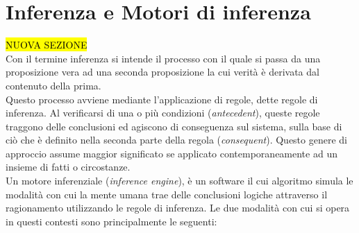 \section{Inferenza e Motori di inferenza}
\hl{NUOVA SEZIONE} \\
 \label{App:AppendiceInference}
 Con  il termine inferenza si intende il processo con il quale si passa da una proposizione vera ad una seconda proposizione la cui verità è derivata dal contenuto della prima. \\
 Questo processo avviene mediante l'applicazione di regole, dette regole di inferenza. Al verificarsi di una o più condizioni (\textit{antecedent}), queste regole traggono delle conclusioni ed agiscono di conseguenza sul sistema, sulla base di ciò che è definito nella seconda parte della regola (\textit{consequent}).
 Questo genere di approccio assume maggior significato se applicato contemporaneamente ad un insieme di fatti o circostanze. \\
 Un motore inferenziale (\textit{inference engine}), è un software il cui algoritmo simula le modalità con cui la mente umana trae delle conclusioni logiche attraverso il ragionamento utilizzando le regole di inferenza.
 Le due modalità con cui si opera in questi contesti sono principalmente le seguenti:

